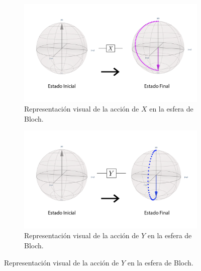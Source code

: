 \documentclass[letterpaper,12pt]{thesisECFM}
\theoremstyle{plain}
\theoremstyle{definition}
\theoremstyle{definition}
\theoremstyle{remark}
\newcommand{\1}{\mathbb{1}}
\begin{document}
\begin{figure}[h!] %
    \centering
    \begin{subfigure}{0.45\textwidth}
        \centering
        \includegraphics[width=\linewidth]{imagenes/Paulix.png}
        \caption{Representación visual de la acción de $X$ en la esfera de Bloch.}
        \label{fig:Paulix}
    \end{subfigure}
    \hspace{1em} %
    \begin{subfigure}{0.45\textwidth}
        \centering
        \includegraphics[width=\linewidth]{imagenes/Pauliy.png}
        \caption{Representación visual de la acción de $Y$ en la esfera de Bloch.}
        \label{fig:Pauliy}
    \end{subfigure}


\end{figure}
\end{document}
